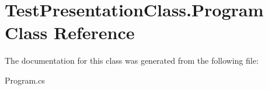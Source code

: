 \hypertarget{class_test_presentation_class_1_1_program}{}\section{Test\+Presentation\+Class.\+Program Class Reference}
\label{class_test_presentation_class_1_1_program}


The documentation for this class was generated from the following file\+:\begin{DoxyCompactItemize}
\item 
Program.\+cs\end{DoxyCompactItemize}
